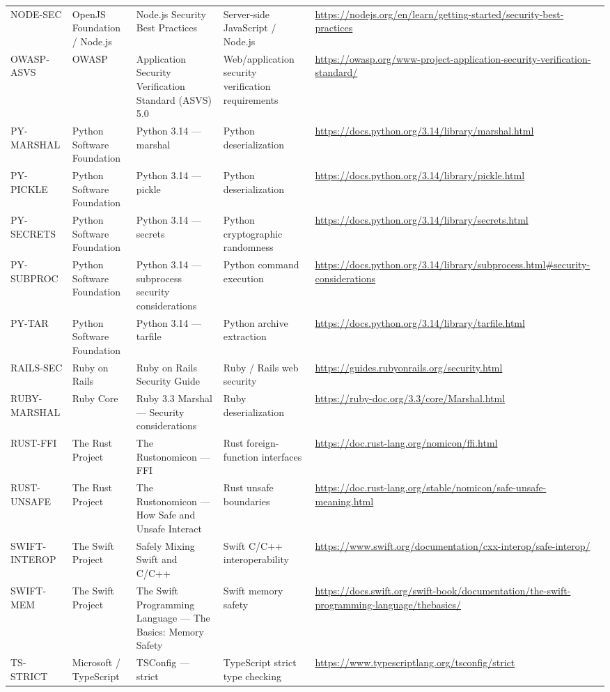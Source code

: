 \documentclass[10pt,letterpaper]{article}
\begin{document}
\begin{landscape}
\begin{longtable}{@{}P{0.82in}P{1.23in}P{2.25in}P{1.7in}P{3.0in}@{}}
NODE-SEC & OpenJS Foundation / Node.js & Node.js Security Best Practices & Server-side JavaScript / Node.js & \url{https://nodejs.org/en/learn/getting-started/security-best-practices}\\
OWASP-ASVS & OWASP & Application Security Verification Standard (ASVS) 5.0 & Web/application security verification requirements & \url{https://owasp.org/www-project-application-security-verification-standard/}\\
PY-MARSHAL & Python Software Foundation & Python 3.14 --- marshal & Python deserialization & \url{https://docs.python.org/3.14/library/marshal.html}\\
PY-PICKLE & Python Software Foundation & Python 3.14 --- pickle & Python deserialization & \url{https://docs.python.org/3.14/library/pickle.html}\\
PY-SECRETS & Python Software Foundation & Python 3.14 --- secrets & Python cryptographic randomness & \url{https://docs.python.org/3.14/library/secrets.html}\\
PY-SUBPROC & Python Software Foundation & Python 3.14 --- subprocess security considerations & Python command execution & \url{https://docs.python.org/3.14/library/subprocess.html\#security-considerations}\\
PY-TAR & Python Software Foundation & Python 3.14 --- tarfile & Python archive extraction & \url{https://docs.python.org/3.14/library/tarfile.html}\\
RAILS-SEC & Ruby on Rails & Ruby on Rails Security Guide & Ruby / Rails web security & \url{https://guides.rubyonrails.org/security.html}\\
RUBY-MARSHAL & Ruby Core & Ruby 3.3 Marshal --- Security considerations & Ruby deserialization & \url{https://ruby-doc.org/3.3/core/Marshal.html}\\
RUST-FFI & The Rust Project & The Rustonomicon --- FFI & Rust foreign-function interfaces & \url{https://doc.rust-lang.org/nomicon/ffi.html}\\
RUST-UNSAFE & The Rust Project & The Rustonomicon --- How Safe and Unsafe Interact & Rust unsafe boundaries & \url{https://doc.rust-lang.org/stable/nomicon/safe-unsafe-meaning.html}\\
SWIFT-INTEROP & The Swift Project & Safely Mixing Swift and C/C++ & Swift C/C++ interoperability & \url{https://www.swift.org/documentation/cxx-interop/safe-interop/}\\
SWIFT-MEM & The Swift Project & The Swift Programming Language --- The Basics: Memory Safety & Swift memory safety & \url{https://docs.swift.org/swift-book/documentation/the-swift-programming-language/thebasics/}\\
TS-STRICT & Microsoft / TypeScript & TSConfig --- strict & TypeScript strict type checking & \url{https://www.typescriptlang.org/tsconfig/strict}\\
\bottomrule
\end{longtable}
\normalsize
\end{landscape}
\end{document}
